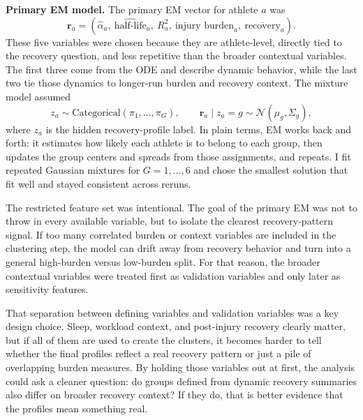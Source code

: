 \documentclass[11pt]{article}
\begin{document}
\textbf{Primary EM model.}
The primary EM vector for athlete $a$ was
\[
\mathbf r_a=(\hat\alpha_a,\ \widehat{\text{half-life}}_a,\ R^2_a,\ \text{injury burden}_a,\ \overline{\text{recovery}}_a).
\]
These five variables were chosen because they are athlete-level, directly tied to the recovery question, and less repetitive than the broader contextual variables. The first three come from the ODE and describe dynamic behavior, while the last two tie those dynamics to longer-run burden and recovery context. The mixture model assumed
\[
z_a\sim \mathrm{Categorical}(\pi_1,\ldots,\pi_G), \qquad
\mathbf r_a\mid z_a=g \sim \mathcal N(\mu_g,\Sigma_g),
\]
where $z_a$ is the hidden recovery-profile label. In plain terms, EM works back and forth: it estimates how likely each athlete is to belong to each group, then updates the group centers and spreads from those assignments, and repeats. I fit repeated Gaussian mixtures for $G=1,\ldots,6$ and chose the smallest solution that fit well and stayed consistent across reruns.

The restricted feature set was intentional. The goal of the primary EM was not to throw in every available variable, but to isolate the clearest recovery-pattern signal. If too many correlated burden or context variables are included in the clustering step, the model can drift away from recovery behavior and turn into a general high-burden versus low-burden split. For that reason, the broader contextual variables were treated first as validation variables and only later as sensitivity features.

That separation between defining variables and validation variables was a key design choice. Sleep, workload context, and post-injury recovery clearly matter, but if all of them are used to create the clusters, it becomes harder to tell whether the final profiles reflect a real recovery pattern or just a pile of overlapping burden measures. By holding those variables out at first, the analysis could ask a cleaner question: do groups defined from dynamic recovery summaries also differ on broader recovery context? If they do, that is better evidence that the profiles mean something real.
\end{document}
